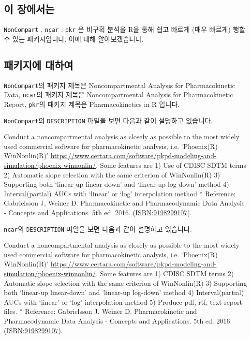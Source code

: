 \documentclass[]{krantz}
\renewenvironment{quote}{\begin{VF}}{\end{VF}}
\theoremstyle{definition}
\theoremstyle{definition}
\theoremstyle{definition}
\theoremstyle{remark}
\begin{document}
\subsection{이 장에서는}\label{summary-r-packages}

\texttt{NonCompart} \citep{R-NonCompart}, \texttt{ncar} \citep{R-ncar},
\texttt{pkr} \citep{R-pkr} 은 비구획 분석을 R을 통해 쉽고 빠르게 (매우
빠르게) 행할 수 있는 패키지입니다. 이에 대해 알아보겠습니다.

\subsection{패키지에 대하여}\label{-}

\texttt{NonCompart}의 패키지 제목은 Noncompartmental Analysis for
Pharmacokinetic Data, \texttt{ncar}의 패키지 제목은 Noncompartmental
Analysis for Pharmacokinetic Report, \texttt{pkr}의 패키지 제목은
Pharmacokinetics in R 입니다.

\texttt{NonCompart}의 \texttt{DESCRIPTION} 파일을 보면 다음과 같이
설명하고 있습니다.

\begin{quote}
Conduct a noncompartmental analysis as closely as possible to the most
widely used commercial software for pharmacokinetic analysis, i.e.
`Phoenix(R) WinNonlin(R)'
\url{https://www.certara.com/software/pkpd-modeling-and-simulation/phoenix-winnonlin/}.
Some features are 1) Use of CDISC SDTM terms 2) Automatic slope
selection with the same criterion of WinNonlin(R) 3) Supporting both
`linear-up linear-down' and `linear-up log-down' method 4)
Interval(partial) AUCs with `linear' or `log' interpolation method *
Reference: Gabrielsson J, Weiner D. Pharmacokinetic and Pharmacodynamic
Data Analysis - Concepts and Applications. 5th ed. 2016.
(\url{ISBN:9198299107}).
\end{quote}

\texttt{ncar}의 \texttt{DESCRIPTION} 파일을 보면 다음과 같이 설명하고
있습니다.

\begin{quote}
Conduct a noncompartmental analysis as closely as possible to the most
widely used commercial software for pharmacokinetic analysis, i.e.
`Phoenix(R) WinNonlin(R)'
\url{https://www.certara.com/software/pkpd-modeling-and-simulation/phoenix-winnonlin/}.
Some features are 1) CDISC SDTM terms 2) Automatic slope selection with
the same criterion of WinNonlin(R) 3) Supporting both `linear-up
linear-down' and `linear-up log-down' method 4) Interval(partial) AUCs
with `linear' or `log' interpolation method 5) Produce pdf, rtf, text
report files. * Reference: Gabrielsson J, Weiner D. Pharmacokinetic and
Pharmacodynamic Data Analysis - Concepts and Applications. 5th ed. 2016.
(\url{ISBN:9198299107}).
\end{quote}
\end{document}
